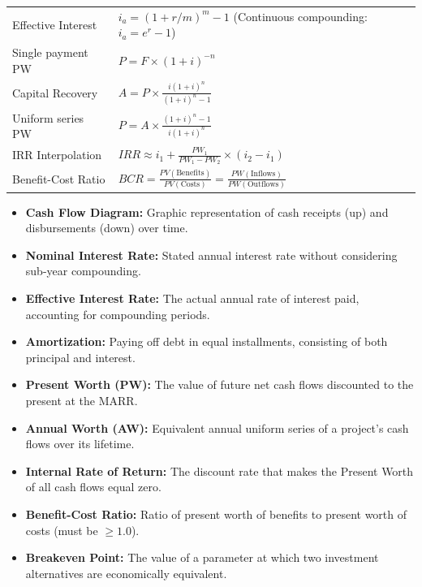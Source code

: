 \documentclass[12pt,a4paper]{article}
\renewcommand{\arraystretch}{1.45}
\begin{document}
\begin{tcolorbox}[formulabox, title={\textbf{Key Formulas at a Glance}}]
\renewcommand{\arraystretch}{1.3}
\begin{tabularx}{\linewidth}{B{3.8cm} X}
Effective Interest      & $i_a = (1 + r/m)^m - 1$ \quad (Continuous compounding: $i_a = e^r - 1$) \\[4pt]
Single payment PW       & $P = F \times (1 + i)^{-n}$ \\[4pt]
Capital Recovery        & $A = P \times \displaystyle\frac{i(1+i)^n}{(1+i)^n - 1}$ \\[6pt]
Uniform series PW       & $P = A \times \displaystyle\frac{(1+i)^n - 1}{i(1+i)^n}$ \\[6pt]
IRR Interpolation       & $IRR \approx i_1 + \displaystyle\frac{PW_1}{PW_1 - PW_2} \times (i_2 - i_1)$ \\[6pt]
Benefit-Cost Ratio      & $BCR = \displaystyle\frac{PV(\text{Benefits})}{PV(\text{Costs})} = \frac{PW(\text{Inflows})}{PW(\text{Outflows})}$
\end{tabularx}
\end{tcolorbox}

\begin{tcolorbox}[defbox, title={\textbf{One-Line Definitions}}]
\begin{itemize}[leftmargin=*, itemsep=2pt, topsep=0pt]
  \item \textbf{Cash Flow Diagram:} Graphic representation of cash receipts (up) and disbursements (down) over time.
  \item \textbf{Nominal Interest Rate:} Stated annual interest rate without considering sub-year compounding.
  \item \textbf{Effective Interest Rate:} The actual annual rate of interest paid, accounting for compounding periods.
  \item \textbf{Amortization:} Paying off debt in equal installments, consisting of both principal and interest.
  \item \textbf{Present Worth (PW):} The value of future net cash flows discounted to the present at the MARR.
  \item \textbf{Annual Worth (AW):} Equivalent annual uniform series of a project's cash flows over its lifetime.
  \item \textbf{Internal Rate of Return:} The discount rate that makes the Present Worth of all cash flows equal zero.
  \item \textbf{Benefit-Cost Ratio:} Ratio of present worth of benefits to present worth of costs (must be $\ge 1.0$).
  \item \textbf{Breakeven Point:} The value of a parameter at which two investment alternatives are economically equivalent.
\end{itemize}
\end{tcolorbox}
\end{document}
